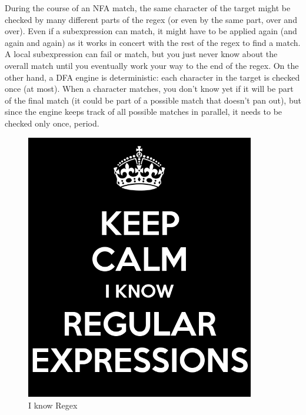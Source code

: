 During the course of an NFA match, the same character of the target 
might be checked by many different parts of the regex (or even by the same part, 
over and over). Even if a subexpression can match, it might have to be applied again 
(and again and again) as it works in concert with the rest of the regex to find a match. 
A local subexpression can fail or match, but you just never know about the overall match 
until you eventually work your way to the end of the regex. On the other hand, a DFA 
engine is deterministic: each character in the target is checked once (at most). When a 
character matches, you don't know yet if it will be part of the final match (it could be 
part of a possible match that doesn't pan out), but since the engine keeps track of all 
possible matches in parallel, it needs to be checked only once, period.

\begin{figure}[h]
	\centering
	\includegraphics[width=100mm]{img/regex.png}
	\caption{I know Regex}
\end{figure}
